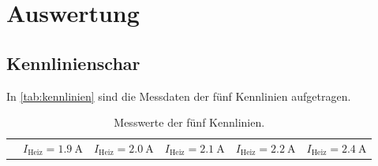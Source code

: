 \section{Auswertung}
\label{sec:Auswertung}


\subsection{Kennlinienschar}

In \autoref{tab:kennlinien} sind die Messdaten der fünf Kennlinien aufgetragen.
\begin{table}
  \centering
  \caption{Messwerte der fünf Kennlinien.}
  \label{tab:kennlinien}
  \begin{tabular}{c c c c c c}
    \toprule
    & \multicolumn{1}{c}{$I_{\text{Heiz}} = \qty{1.9}{\ampere}$} &
      \multicolumn{1}{c}{$I_{\text{Heiz}} = \qty{2.0}{\ampere}$} &
      \multicolumn{1}{c}{$I_{\text{Heiz}} = \qty{2.1}{\ampere}$} &
      \multicolumn{1}{c}{$I_{\text{Heiz}} = \qty{2.2}{\ampere}$} &
      \multicolumn{1}{c}{$I_{\text{Heiz}} = \qty{2.4}{\ampere}$} \\
      \cmidrule(lr){2-2}\cmidrule(lr){3-3}\cmidrule(lr){4-4}\cmidrule(lr){5-5}\cmidrule(lr){6-6}


\end{tabular}
\end{table}
